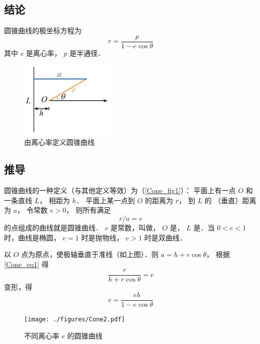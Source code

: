 

\subsection{结论}
圆锥曲线的极坐标方程为
\begin{equation}\label{Cone_eq5}
r  = \frac{p}{1 - e\cos \theta }
\end{equation}
其中 $e$ 是离心率， $p$ 是半通径．

\begin{figure}[ht]
\centering
\includegraphics[width=4.5cm]{./figures/Cone1.pdf}
\caption{由离心率定义圆锥曲线}\label{Cone_fig1}
\end{figure}

\subsection{推导}
圆锥曲线的一种定义（与其他定义等效）为（\autoref{Cone_fig1}）：
平面上有一点 $O$ 和一条直线 $L$， 相距为 $h$． 
平面上某一点到 $O$ 的距离为 $r$， 到 $L$ 的
（垂直）距离为 $a$， 令常数 $e > 0$， 则所有满足
\begin{equation}\label{Cone_eq1}
r/a = e
\end{equation}
的点组成的曲线就是圆锥曲线． $e$ 是常数，叫做， $O$ 是， $L$ 是．当 $0 < e < 1$ 时，曲线是椭圆， $e = 1$ 时是抛物线， $e > 1$ 时是双曲线．

以 $O$ 点为原点，使极轴垂直于准线（如上图）．则 $a = h + r \cos \theta $， 根据\autoref{Cone_eq1} 得
\begin{equation}\label{Cone_eq2}
\frac{r}{h + r \cos \theta } = e
\end{equation}
变形，得
\begin{equation}\label{Cone_eq3}
r = \frac{eh}{1 - e\cos \theta }
\end{equation}

\begin{figure}[ht]
\centering
\texttt{[image: ./figures/Cone2.pdf]}
\caption{不同离心率 $e$ 的圆锥曲线} \label{Cone_fig2}
\end{figure}

